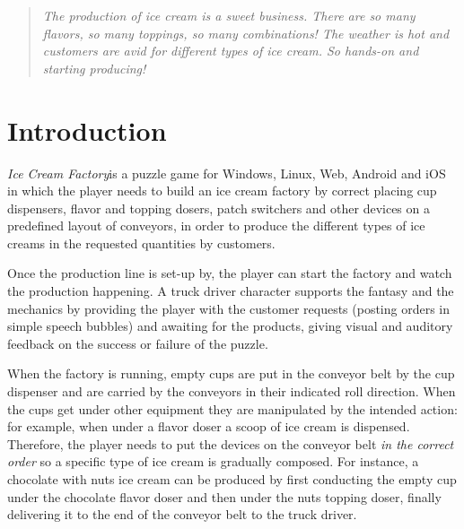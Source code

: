 \documentclass[a4paper]{scrartcl}
\title{\gamename}
\subtitle{Game Design Document}
\author{}
\date{\today}
\begin{document}
\newcommand{\gamename}{\emph{Ice Cream Factory}}

\maketitle

    \begin{quotation}
        \noindent
        \textit{The production of ice cream is a sweet business. There are so
                many flavors, so many toppings, so many combinations! The
                weather is hot and customers are avid for different types of ice
                cream. So hands-on and starting producing!}
    \end{quotation}

\section{Introduction}
    \gamename is a puzzle game for Windows, Linux, Web, Android and iOS in which
    the player needs to build an ice cream factory by correct placing cup
    dispensers, flavor and topping dosers, patch switchers and other devices on
    a predefined layout of conveyors, in order to produce the different types of
    ice creams in the requested quantities by customers.

    Once the production line is set-up by, the player can start the factory and
    watch the production happening. A truck driver character supports the
    fantasy and the mechanics by providing the player with the customer requests
    (posting orders in simple speech bubbles) and awaiting for the products,
    giving visual and auditory feedback on the success or failure of the puzzle.

    When the factory is running, empty cups are put in the conveyor belt by the
    cup dispenser and are carried by the conveyors in their indicated roll
    direction. When the cups get under other equipment they are manipulated by
    the intended action: for example, when under a flavor doser a scoop of ice
    cream is dispensed. Therefore, the player needs to put the devices on the
    conveyor belt \textit{in the correct order} so a specific type of ice cream
    is gradually composed. For instance, a chocolate with nuts ice cream can be
    produced by first conducting the empty cup under the chocolate flavor doser
    and then under the nuts topping doser, finally delivering it to the end of
    the conveyor belt to the truck driver.
\end{document}
